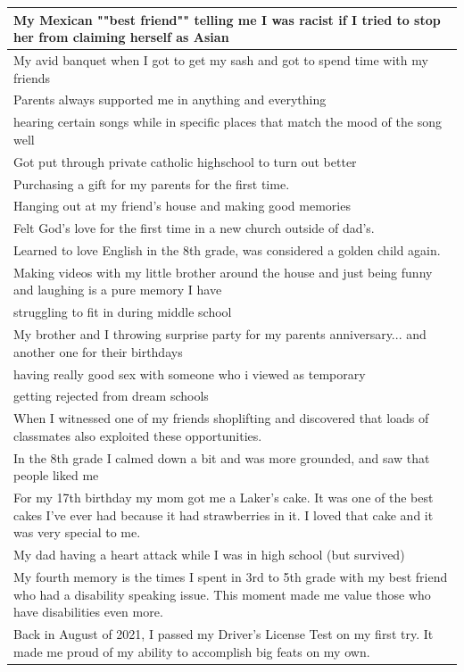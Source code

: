 \documentclass[
  .7em,
  letterpaper,
  DIV=11,
  numbers=noendperiod]{scrartcl}
\begin{document}
\begin{table}
\begin{tabular}{l}
\hline
My Mexican ""best friend"" telling me I was racist if I tried to stop her from claiming herself as Asian\\
\hline
My avid banquet when I got to get my sash and got to spend time with my friends\\
\hline
Parents always supported me in anything and everything\\
\hline
hearing certain songs while in specific places that match the mood of the song well\\
\hline
Got put through private catholic highschool to turn out better\\
\hline
Purchasing a gift for my parents for the first time.\\
\hline
Hanging out at my friend's house and making good memories\\
\hline
Felt God's love for the first time in a new church outside of dad's.\\
\hline
Learned to love English in the 8th grade, was considered a golden child again.\\
\hline
Making videos with my little brother around the house and just being funny and laughing is a pure memory I have\\
\hline
struggling to fit in during middle school\\
\hline
My brother and I throwing surprise party for my parents anniversary... and another one for their birthdays\\
\hline
having really good sex with someone who i viewed as temporary\\
\hline
getting rejected from dream schools\\
\hline
When I witnessed one of my friends shoplifting and discovered that loads of classmates also exploited these opportunities.\\
\hline
In the 8th grade I calmed down a bit and was more grounded, and saw that people liked me\\
\hline
For my 17th birthday my mom got me a Laker's cake. It was one of the best cakes I've ever had because it had strawberries in it. I loved that cake and it was very special to me.\\
\hline
My dad having a heart attack while I was in high school (but survived)\\
\hline
My fourth memory is the times I spent in 3rd to 5th grade with my best friend who had a disability speaking issue. This moment made me value those who have disabilities even more.\\
\hline
Back in August of 2021, I passed my Driver's License Test on my first try. It made me proud of my ability to accomplish big feats on my own.\\

\end{tabular}
\end{table}
\end{document}
